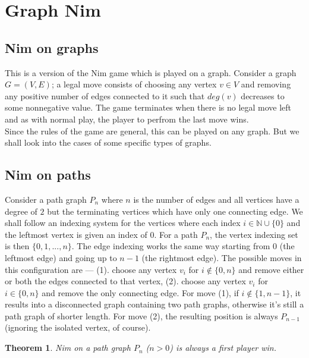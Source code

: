 \documentclass[a4paper, 12pt]{article}
\newtheorem{theorem}{Theorem}[section] %
\theoremstyle{remark} %
\begin{document}
\section{Graph Nim}
\label{graphnim}

\subsection{Nim on graphs}

This is a version of the Nim game which is played on a graph. Consider a graph $G=(V,E)$; a legal move consists of choosing any vertex $v \in V$ and removing any positive number of edges connected to it such that $deg(v)$ decreases to some nonnegative value. The game terminates when there is no legal move left and as with normal play, the player to perfrom the last move wins.\\

Since the rules of the game are general, this can be played on any graph. But we shall look into the cases of some specific types of graphs.

\subsection{Nim on paths}

Consider a path graph $P_n$ where $n$ is the number of edges and all vertices have a degree of $2$ but the terminating vertices which have only one connecting edge. We shall follow an indexing system for the vertices where each index $i \in \mathbb{N}\cup\{0\}$ and the leftmost vertex is given an index of $0$.  For a path $P_n$, the vertex indexing set is then $\{0, 1, ..., n\}$. The edge indexing works the same way starting from $0$ (the leftmost edge) and going up to $n-1$ (the rightmost edge). The possible moves in this configuration are --- (1). choose any vertex $v_i$ for $i \not\in \{0,n\}$ and remove either or both the edges connected to that vertex, (2). choose any vertex $v_i$ for $i \in \{0,n\}$ and remove the only connecting edge. For move (1), if $i \not\in \{1, n-1\}$, it results into a disconnected graph containing two path graphs, otherwise it's still a path graph of shorter length. For move (2), the resulting position is always $P_{n-1}$ (ignoring the isolated vertex, of course).

\begin{theorem}
	Nim on a path graph $P_n$ ($n > 0$) is always a first player win.
\end{theorem}
\end{document}
